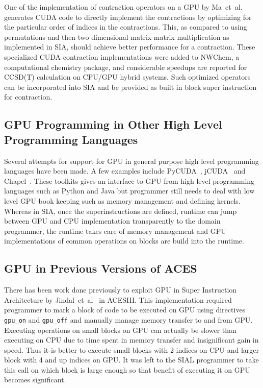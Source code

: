 One of the implementation of contraction operators on a GPU by
Ma~et~al.~\cite{Ma2013} generates CUDA code to directly implement the contractions
by optimizing for the particular order of indices in the contractions. This, as
compared to using permutations and then two dimensional matrix-matrix multiplication
as implemented in SIA, should achieve better performance for a contraction. These
specialized CUDA contraction implementations were added to NWChem, a computational
chemistry package, and considerable speedups are reported for CCSD(T) calculation
on CPU/GPU hybrid systems. Such optimized operators can be incorporated into SIA
and be provided as built in block super instruction for contraction.

\subsection{GPU Programming in Other High Level Programming Languages}
Several attempts for support for GPU in general purpose high level programming
languages have been made. A few examples include PyCUDA~\cite{pycuda2011},
jCUDA~\cite{jcuda2009} and Chapel~\cite{chapelgpu}. These toolkits gives an interface
to GPU from high level programming languages such as Python and Java but
programmer still needs to deal with low level GPU book keeping such as memory
management and defining kernels. Whereas in SIA, once the superinstructions are
defined, runtime can jump between GPU and CPU implementation transparently to
the domain programmer, the runtime takes care of memory management and GPU
implementations of common operations on blocks are build into the runtime.

\subsection{GPU in Previous Versions of ACES}
There has been work done previously to exploit GPU in Super Instruction
Architecture by Jindal~et~al~\cite{jindal2016gpusial} in ACESIII. This implementation
required programmer to mark a block of code to be executed on GPU using
directives \texttt{gpu\_on} and \texttt{gpu\_off} and manually manage memory
transfer to and from GPU. Executing operations on small blocks on GPU can
actually be slower than executing on CPU due to time spent in memory transfer and
insignificant gain in speed. Thus it is better to execute small blocks with 2
indices on CPU and larger block with 4 and up indices on GPU. It was left to the
SIAL programmer to take this call on which block is large enough so that benefit
of executing it on GPU becomes significant.

